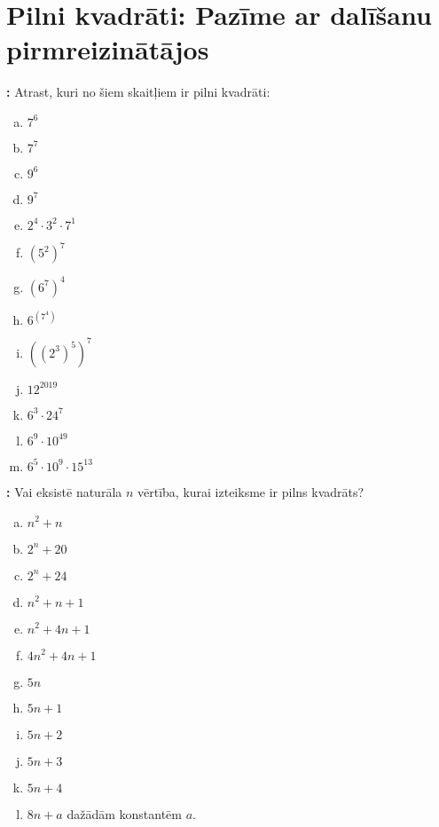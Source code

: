 \documentclass[11pt]{article}
\author{\mbox{}\hspace{1ex}\vspace{-4ex}%
}
\date{2019-04-11}
\title{}
\newenvironment{uzdevums}[1][\unskip]{%
\vspace{3mm}
\noindent
\textbf{#1:}
\noindent}
{}
\begin{document}
\maketitle

\section{Pilni kvadrāti: Pazīme ar dalīšanu pirmreizinātājos}

\begin{uzdevums}
Atrast, kuri no šiem skaitļiem ir pilni kvadrāti: 
\begin{enumerate}[(a)]
\item $7^6$
\item $7^7$
\item $9^6$
\item $9^7$
\item $2^4\cdot{}3^2\cdot{}7^1$
\item $\left( 5^2 \right)^7$
\item $\left( 6^7 \right)^4$
\item $6^{(7^4)}$
\item $\left( \left( 2^3 \right)^5 \right)^7$
\item $12^{2019}$
\item $6^3\cdot{}24^7$
\item $6^9\cdot{}10^{49}$
\item $6^5\cdot{}10^9\cdot{}15^{13}$
\end{enumerate}
\end{uzdevums}



\begin{uzdevums}
Vai eksistē naturāla $n$ vērtība, kurai izteiksme ir pilns kvadrāts?
\begin{enumerate}[(a)]
\item $n^2+n$
\item $2^n+20$
\item $2^n+24$
\item $n^2+n+1$
\item $n^2+4n+1$
\item $4n^2+4n+1$
\item $5n$
\item $5n+1$
\item $5n+2$
\item $5n+3$
\item $5n+4$
\item $8n+a$ dažādām konstantēm $a$.
\end{enumerate}
\end{uzdevums}
\end{document}
